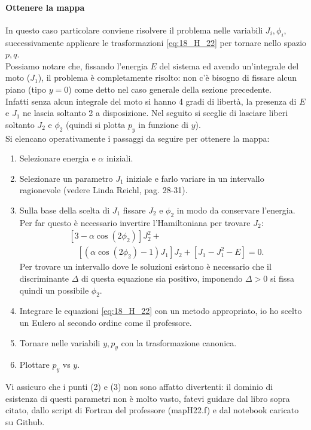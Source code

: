 \paragraph{Ottenere la mappa}%
\label{par:Ottenere la mappa}
In questo caso particolare conviene risolvere il problema nelle variabili $J_i, \phi_i$, successivamente applicare le trasformazioni \ref{eq:18_H_22} per tornare nello spazio $p,q$.\\
Possiamo notare che, fissando l'energia $E$ del sistema ed avendo un'integrale del moto ($J_1$), il problema è completamente risolto: non c'è bisogno di fissare alcun piano (tipo $y=0$) come detto nel caso generale della sezione precedente.\\
Infatti senza alcun integrale del moto si hanno 4 gradi di libertà, la presenza di $E$ e $J_1$ ne lascia soltanto 2 a disposizione. Nel seguito si sceglie di lasciare liberi soltanto $J_{2}$ e $\phi_2$ (quindi si plotta $p_y$ in funzione di $y$).\\
Si elencano operativamente i passaggi da seguire per ottenere la mappa:
\begin{enumerate}
    \item Selezionare energia e $\alpha$ iniziali. 
    \item Selezionare un parametro $J_1$ iniziale e farlo variare in un intervallo ragionevole (vedere Linda Reichl, pag. 28-31).
    \item Sulla base della scelta di $J_1$ fissare $J_2$ e $\phi_2$ in modo da conservare l'energia. Per far questo è necessario invertire l'Hamiltoniana per trovare $J_2$:
	\[\begin{aligned}
	    &\left[3-\alpha\cos (2\phi_2)\right]J_2^2 + \\
	    & \quad \left[\left(\alpha\cos (2\phi_2)-1\right)J_1\right]J_2 + \left[J_1-J_1^2 - E\right] = 0
	.\end{aligned}\]
	Per trovare un intervallo dove le soluzioni esistono è necessario che il discriminante $\Delta$ di questa equazione sia positivo, imponendo $\Delta > 0$ si fissa quindi un possibile $\phi_2$.
    \item Integrare le equazioni \ref{eq:18_H_22} con un metodo appropriato, io ho scelto un Eulero al secondo ordine come il professore.
    \item Tornare nelle variabili $y, p_y$ con la trasformazione canonica.
    \item Plottare $p_y$ vs $y$.
\end{enumerate}
Vi assicuro che i punti (2) e (3) non sono affatto divertenti: il dominio di esistenza di questi parametri non è molto vasto, fatevi guidare dal libro sopra citato, dallo script di Fortran del professore (mapH22.f) e dal notebook caricato su Github.\\
